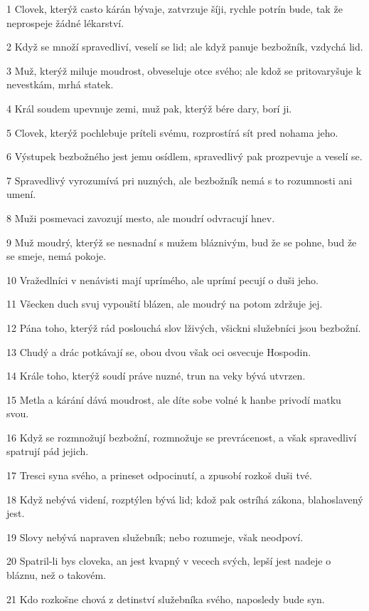 \par 1 Clovek, kterýž casto kárán bývaje, zatvrzuje šíji, rychle potrín bude, tak že neprospeje žádné lékarství.
\par 2 Když se množí spravedliví, veselí se lid; ale když panuje bezbožník, vzdychá lid.
\par 3 Muž, kterýž miluje moudrost, obveseluje otce svého; ale kdož se pritovaryšuje k nevestkám, mrhá statek.
\par 4 Král soudem upevnuje zemi, muž pak, kterýž bére dary, borí ji.
\par 5 Clovek, kterýž pochlebuje príteli svému, rozprostírá sít pred nohama jeho.
\par 6 Výstupek bezbožného jest jemu osídlem, spravedlivý pak prozpevuje a veselí se.
\par 7 Spravedlivý vyrozumívá pri nuzných, ale bezbožník nemá s to rozumnosti ani umení.
\par 8 Muži posmevaci zavozují mesto, ale moudrí odvracují hnev.
\par 9 Muž moudrý, kterýž se nesnadní s mužem bláznivým, bud že se pohne, bud že se smeje, nemá pokoje.
\par 10 Vražedlníci v nenávisti mají uprímého, ale uprímí pecují o duši jeho.
\par 11 Všecken duch svuj vypouští blázen, ale moudrý na potom zdržuje jej.
\par 12 Pána toho, kterýž rád poslouchá slov lživých, všickni služebníci jsou bezbožní.
\par 13 Chudý a drác potkávají se, obou dvou však oci osvecuje Hospodin.
\par 14 Krále toho, kterýž soudí práve nuzné, trun na veky bývá utvrzen.
\par 15 Metla a kárání dává moudrost, ale díte sobe volné k hanbe privodí matku svou.
\par 16 Když se rozmnožují bezbožní, rozmnožuje se prevrácenost, a však spravedliví spatrují pád jejich.
\par 17 Tresci syna svého, a prineset odpocinutí, a zpusobí rozkoš duši tvé.
\par 18 Když nebývá videní, rozptýlen bývá lid; kdož pak ostríhá zákona, blahoslavený jest.
\par 19 Slovy nebývá napraven služebník; nebo rozumeje, však neodpoví.
\par 20 Spatril-li bys cloveka, an jest kvapný v vecech svých, lepší jest nadeje o bláznu, než o takovém.
\par 21 Kdo rozkošne chová z detinství služebníka svého, naposledy bude syn.

